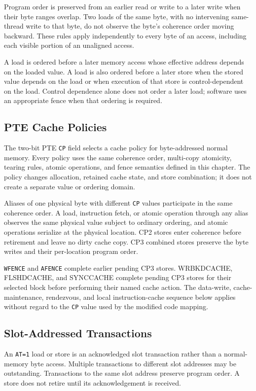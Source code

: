 Program order is preserved from an earlier read or write to a later write when their byte ranges overlap. Two loads
of the same byte, with no intervening same-thread write to that byte, do not observe the byte's coherence order moving
backward. These rules apply independently to every byte of an access, including each visible portion of an unaligned
access.

A load is ordered before a later memory access whose effective address depends on the loaded value. A load is also
ordered before a later store when the stored value depends on the load or when execution of that store is
control-dependent on the load. Control dependence alone does not order a later load; software uses an appropriate
fence when that ordering is required.

\subsection{PTE Cache Policies}
The two-bit PTE \texttt{CP} field selects a cache policy for byte-addressed normal memory. Every policy uses the
same coherence order, multi-copy atomicity, tearing rules, atomic operations, and fence semantics defined in this
chapter. The policy changes allocation, retained cache state, and store combination; it does not create a separate
value or ordering domain.



Aliases of one physical byte with different \texttt{CP} values participate in the same coherence order. A load,
instruction fetch, or atomic operation through any alias observes the same physical value subject to ordinary
ordering, and atomic operations serialize at the physical location. CP2 stores enter coherence before retirement
and leave no dirty cache copy. CP3 combined stores preserve the byte writes and their per-location program order.

\texttt{WFENCE} and \texttt{AFENCE} complete earlier pending CP3 stores. WRBKDCACHE, FLSHDCACHE, and SYNCCACHE
complete pending CP3 stores for their selected block before performing their named cache action. The
data-write, cache-maintenance, rendezvous, and local instruction-cache sequence below applies without regard to the
\texttt{CP} value used by the modified code mapping.

\subsection{Slot-Addressed Transactions}
An \texttt{AT=1} load or store is an acknowledged slot transaction rather than a normal-memory byte access. Multiple
transactions to different slot addresses may be outstanding. Transactions to the same slot address preserve program
order. A store does not retire until its acknowledgement is received.

